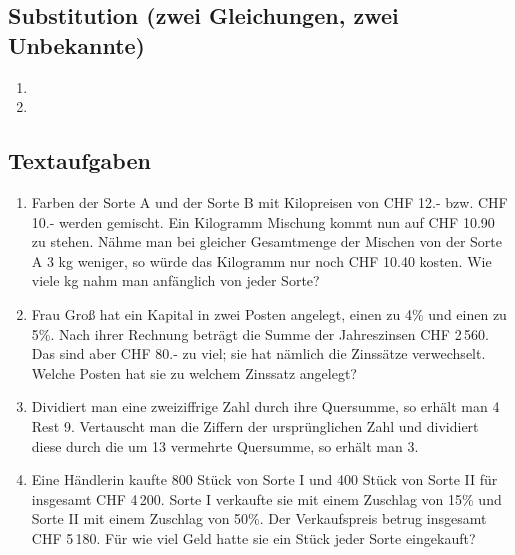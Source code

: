   \subsection{Substitution (zwei Gleichungen, zwei Unbekannte)}

\begin{multicols}{2}
  \begin{enumerate}
  \item

  \item
  \end{enumerate}
\end{multicols}

  \subsection{Textaufgaben}

  \begin{enumerate}
  \item
    Farben der Sorte A und der Sorte B mit Kilopreisen von CHF 12.-
    bzw. CHF 10.- werden gemischt. Ein Kilogramm Mischung kommt nun
    auf CHF 10.90 zu stehen. Nähme man bei gleicher Gesamtmenge der
    Mischen von der Sorte A 3 kg weniger, so würde das Kilogramm nur
    noch CHF 10.40 kosten. Wie viele kg nahm man anfänglich von jeder
    Sorte?

    \item Frau Groß hat ein Kapital in zwei Posten angelegt, einen zu
      4\% und einen zu 5\%. Nach ihrer Rechnung beträgt die Summe der
      Jahreszinsen CHF 2\,560. Das sind aber CHF 80.- zu viel; sie hat
      nämlich die Zinssätze verwechselt. Welche Posten hat sie zu
      welchem Zinssatz angelegt?

      \item Dividiert man eine zweiziffrige Zahl durch ihre Quersumme,
        so erhält man 4 Rest 9. Vertauscht man die Ziffern der
        ursprünglichen Zahl und dividiert diese durch die um 13
        vermehrte Quersumme, so erhält man 3.


        \item Eine Händlerin kaufte 800 Stück von Sorte I und 400
          Stück von Sorte II für insgesamt CHF 4\,200. Sorte I
          verkaufte sie mit einem Zuschlag von 15\% und Sorte II mit
          einem Zuschlag von 50\%. Der Verkaufspreis betrug insgesamt
          CHF 5\,180. Für wie viel Geld hatte sie ein Stück jeder
          Sorte eingekauft?
          
    \end{enumerate}


